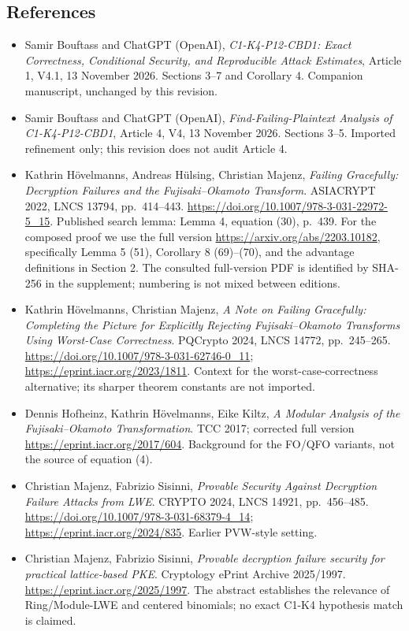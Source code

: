 \documentclass[11pt,a4paper]{article}
\providecommand{\tightlist}{\setlength{\itemsep}{0pt}\setlength{\parskip}{0pt}}
\begin{document}
\subsection{References}\label{references}

\begin{itemize}
\tightlist
\item
  Samir Bouftass and ChatGPT (OpenAI), \emph{C1-K4-P12-CBD1: Exact Correctness, Conditional Security, and Reproducible Attack Estimates}, Article 1, V4.1, 13 November 2026. Sections 3--7 and Corollary 4. Companion manuscript, unchanged by this revision.
\item
  Samir Bouftass and ChatGPT (OpenAI), \emph{Find-Failing-Plaintext Analysis of C1-K4-P12-CBD1}, Article 4, V4, 13 November 2026. Sections 3--5. Imported refinement only; this revision does not audit Article 4.
\item
  Kathrin Hövelmanns, Andreas Hülsing, Christian Majenz, \emph{Failing Gracefully: Decryption Failures and the Fujisaki--Okamoto Transform}. ASIACRYPT 2022, LNCS 13794, pp.~414--443. \url{https://doi.org/10.1007/978-3-031-22972-5_15}. Published search lemma: Lemma 4, equation (30), p.~439. For the composed proof we use the full version \url{https://arxiv.org/abs/2203.10182}, specifically Lemma 5 (51), Corollary 8 (69)--(70), and the advantage definitions in Section 2. The consulted full-version PDF is identified by SHA-256 in the supplement; numbering is not mixed between editions.
\item
  Kathrin Hövelmanns, Christian Majenz, \emph{A Note on Failing Gracefully: Completing the Picture for Explicitly Rejecting Fujisaki--Okamoto Transforms Using Worst-Case Correctness}. PQCrypto 2024, LNCS 14772, pp.~245--265. \url{https://doi.org/10.1007/978-3-031-62746-0_11}; \url{https://eprint.iacr.org/2023/1811}. Context for the worst-case-correctness alternative; its sharper theorem constants are not imported.
\item
  Dennis Hofheinz, Kathrin Hövelmanns, Eike Kiltz, \emph{A Modular Analysis of the Fujisaki--Okamoto Transformation}. TCC 2017; corrected full version \url{https://eprint.iacr.org/2017/604}. Background for the FO/QFO variants, not the source of equation (4).
\item
  Christian Majenz, Fabrizio Sisinni, \emph{Provable Security Against Decryption Failure Attacks from LWE}. CRYPTO 2024, LNCS 14921, pp.~456--485. \url{https://doi.org/10.1007/978-3-031-68379-4_14}; \url{https://eprint.iacr.org/2024/835}. Earlier PVW-style setting.
\item
  Christian Majenz, Fabrizio Sisinni, \emph{Provable decryption failure security for practical lattice-based PKE}. Cryptology ePrint Archive 2025/1997. \url{https://eprint.iacr.org/2025/1997}. The abstract establishes the relevance of Ring/Module-LWE and centered binomials; no exact C1-K4 hypothesis match is claimed.
\end{itemize}
\end{document}

